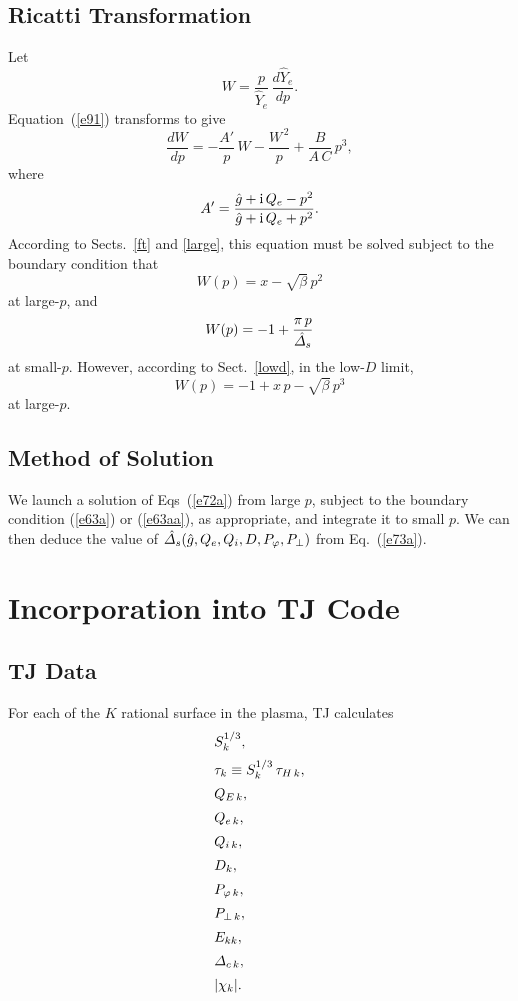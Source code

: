 \documentclass[12pt,prb,aps,notitlepage]{revtex4-1}
\begin{document}
\subsection{Ricatti Transformation}
Let 
\begin{equation}
W= \frac{p}{\hat{Y}_e}\,\frac{d\hat{Y}_e}{dp}.
\end{equation}
Equation~(\ref{e91}) transforms to give
\begin{equation}\label{e72a}
\frac{dW}{dp} =- \frac{A'}{p}\,W -\frac{W^{\,2}}{p} + \frac{B}{A\,C}\,p^3,
\end{equation}
where
\begin{equation}
A' = \frac{\hat{g}+{\rm i}\,Q_e-p^2}{\hat{g}+{\rm i}\,Q_e+p^2}.
\end{equation}
According to Sects.~\ref{ft} and \ref{large}, this equation must be solved subject to the boundary condition that
\begin{equation}\label{e63a}
W(p) = x-\sqrt{\beta}\,p^2
\end{equation}
at large-$p$, and
\begin{equation}\label{e73a}
W (p)=-1+\frac{\pi\,p}{\hat{\mit\Delta}_s}
\end{equation}
at small-$p$. 
However, according to Sect.~\ref{lowd}, in the low-$D$ limit,
\begin{equation}\label{e63aa}
W(p) = -1 +x\,p-\sqrt{\beta}\,p^3
\end{equation}
at large-$p$. 

\subsection{Method of Solution}
We launch a solution of Eqs~(\ref{e72a})  from large $p$, subject to the  boundary condition (\ref{e63a}) or (\ref{e63aa}), as appropriate,  and
integrate it to small $p$. We can then deduce the value of $\hat{\mit\Delta}_s(\hat{g},Q_e,Q_i,D,P_\varphi,P_\perp)$ from Eq.~(\ref{e73a}). 

\section{Incorporation into TJ Code}
\subsection{TJ Data}
For each of the $K$ rational surface in the plasma, TJ calculates
\begin{align}
&S^{1/3}_k,\\[0.5ex]
&\tau_k \equiv S^{1/3}_k\,\tau_{H\,k},\\[0.5ex]
&Q_{E\,k},\\[0.5ex]
&Q_{e\,k},\\[0.5ex]
&Q_{i\,k},\\[0.5ex]
&D_k,\\[0.5ex]
&P_{\varphi\,k},\\[0.5ex]
&P_{\perp\,k},\\[0.5ex]
&E_{kk},\\[0.5ex]
&{\mit\Delta}_{c\,k},\\[0.5ex]
&|\chi_k|.
\end{align}
\end{document}
